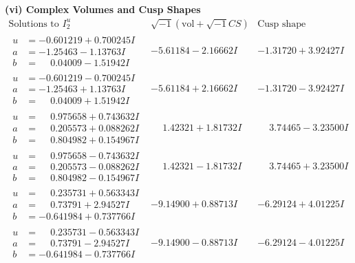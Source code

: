 \documentclass[1p]{elsarticle_modified}
\theoremstyle{definition}
\newcommand{\I}{\sqrt{-1}}
\begin{document}
\newpage\flushleft \textbf{(vi) Complex Volumes and Cusp Shapes}
$$\begin{array}{c|c|c}  
\text{Solutions to }I^u_{2}& \I (\text{vol} + \sqrt{-1}CS) & \text{Cusp shape}\\
 \hline 
\begin{aligned}
u &= -0.601219 + 0.700245 I \\
a &= -1.25463 - 1.13763 I \\
b &= \phantom{-}0.04009 - 1.51942 I\end{aligned}
 & -5.61184 - 2.16662 I & -1.31720 + 3.92427 I \\ \hline\begin{aligned}
u &= -0.601219 - 0.700245 I \\
a &= -1.25463 + 1.13763 I \\
b &= \phantom{-}0.04009 + 1.51942 I\end{aligned}
 & -5.61184 + 2.16662 I & -1.31720 - 3.92427 I \\ \hline\begin{aligned}
u &= \phantom{-}0.975658 + 0.743632 I \\
a &= \phantom{-}0.205573 + 0.088262 I \\
b &= \phantom{-}0.804982 + 0.154967 I\end{aligned}
 & \phantom{-}1.42321 + 1.81732 I & \phantom{-}3.74465 - 3.23500 I \\ \hline\begin{aligned}
u &= \phantom{-}0.975658 - 0.743632 I \\
a &= \phantom{-}0.205573 - 0.088262 I \\
b &= \phantom{-}0.804982 - 0.154967 I\end{aligned}
 & \phantom{-}1.42321 - 1.81732 I & \phantom{-}3.74465 + 3.23500 I \\ \hline\begin{aligned}
u &= \phantom{-}0.235731 + 0.563343 I \\
a &= \phantom{-}0.73791 + 2.94527 I \\
b &= -0.641984 + 0.737766 I\end{aligned}
 & -9.14900 + 0.88713 I & -6.29124 + 4.01225 I \\ \hline\begin{aligned}
u &= \phantom{-}0.235731 - 0.563343 I \\
a &= \phantom{-}0.73791 - 2.94527 I \\
b &= -0.641984 - 0.737766 I\end{aligned}
 & -9.14900 - 0.88713 I & -6.29124 - 4.01225 I \\ \hline\begin{aligned}

\end{aligned}
\end{array}$$
\end{document}
